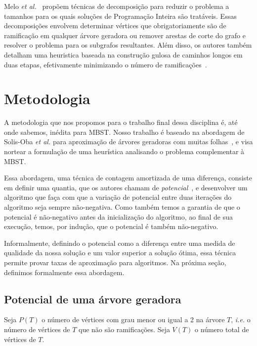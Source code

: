 \documentclass[conference]{IEEEtran}
\begin{document}
Melo \textit{et al.}~\cite{melo2016} propõem técnicas de decomposição para reduzir o problema a tamanhos para os quais soluções de Programação Inteira são tratáveis.
Essas decomposições envolvem determinar vértices que obrigatoriamente são de ramificação em qualquer árvore geradora ou remover arestas de corte do grafo e resolver o problema para os subgrafos resultantes.
Além disso, os autores também detalham uma heuristica baseada na construção gulosa de caminhos longos em duas etapas, efetivamente minimizando o número de ramificações~\cite{melo2016}.

\section{Metodologia} \label{sec:methodology}

A metodologia que nos propomos para o trabalho final dessa disciplina é, até onde sabemos, inédita para MBST.
Nosso trabalho \'e baseado na abordagem de Solis-Oba \textit{et al.} para aproximação de árvores
geradoras com muitas folhas~\cite{solis-oba2017}, e visa nortear a formulação de uma heurística
analisando o problema complementar à MBST.

Essa abordagem, uma t\'ecnica de contagem amortizada de uma diferen\c{c}a, consiste em definir uma
quantia, que os autores chamam de \emph{potencial}~\cite{solis-oba2017}, e desenvolver um algoritmo
que fa\c{c}a com que a varia\c{c}\~ao de potencial entre duas itera\c{c}\~oes do algoritmo seja
sempre n\~ao-negativa. Como tamb\'em temos a garantia de que o potencial \'e n\~ao-negativo antes
da inicializa\c{c}\~ao do algoritmo, ao final de sua execu\c{c}\~ao, temos, por indu\c{c}\~ao, que
o potencial \'e tamb\'em n\~ao-negativo.

Informalmente, definindo o potencial como a diferen\c{c}a entre uma medida de qualidade da nossa
solu\c{c}\~ao e um valor superior a solu\c{c}\~ao \'otima, essa t\'ecnica permite provar taxas de
aproxima\c{c}\~ao para algoritmos. Na pr\'oxima se\c{c}\~ao, definimos formalmente essa abordagem.

\subsection{Potencial de uma \'arvore geradora} \label{sec:potential}
Seja $P(T)$ o n\'umero de v\'ertices com grau menor ou igual a 2 na \'arvore $T$, \textit{i.e.} o
n\'umero de v\'ertices de $T$ que n\~ao s\~ao ramifica\c{c}\~oes. Seja $V(T)$ o n\'umero total de
v\'ertices de $T$.
\end{document}
